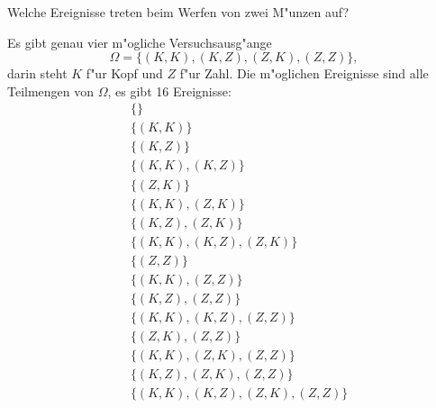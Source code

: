 Welche Ereignisse treten beim Werfen von zwei M"unzen auf?

\begin{loesung}
Es gibt genau vier m"ogliche Versuchsausg"ange
\[
\Omega=\{
(K,K),
(K,Z),
(Z,K),
(Z,Z)\},
\]
darin steht  $K$ f"ur Kopf und $Z$ f"ur Zahl.
Die m"oglichen Ereignisse sind alle Teilmengen von $\Omega$, es
gibt 16 Ereignisse:
\begin{align*}
&\{                           \}\\
&\{(K,K)                      \}\\
&\{       (K,Z)               \}\\
&\{(K,K), (K,Z)               \}\\
&\{              (Z,K)        \}\\
&\{(K,K),        (Z,K)        \}\\
&\{       (K,Z), (Z,K)        \}\\
&\{(K,K), (K,Z), (Z,K)        \}\\
&\{                     (Z,Z) \}\\
&\{(K,K),               (Z,Z) \}\\
&\{       (K,Z),        (Z,Z) \}\\
&\{(K,K), (K,Z),        (Z,Z) \}\\
&\{              (Z,K), (Z,Z) \}\\
&\{(K,K),        (Z,K), (Z,Z) \}\\
&\{       (K,Z), (Z,K), (Z,Z) \}\\
&\{(K,K), (K,Z), (Z,K), (Z,Z) \}\\
\end{align*}
\end{loesung}

